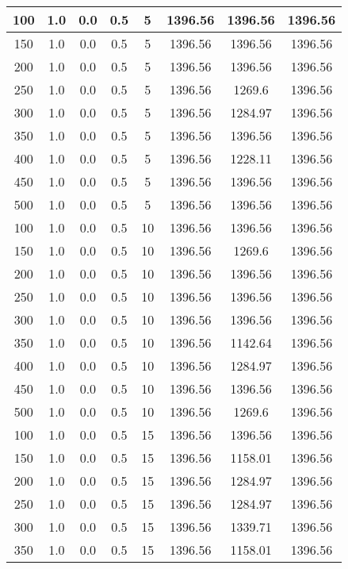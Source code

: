 \documentclass[a4paper, 12pt]{extreport}
\begin{document}
\begin{itemize}
\begin{longtable}{|c|c|c|c|c|c|c|c|}
			100 & 1.0 & 0.0 & 0.5 & 5 & 1396.56 & 1396.56 & 1396.56 \\\hline
			150 & 1.0 & 0.0 & 0.5 & 5 & 1396.56 & 1396.56 & 1396.56 \\\hline
			200 & 1.0 & 0.0 & 0.5 & 5 & 1396.56 & 1396.56 & 1396.56 \\\hline
			250 & 1.0 & 0.0 & 0.5 & 5 & 1396.56 & 1269.6 & 1396.56 \\\hline
			300 & 1.0 & 0.0 & 0.5 & 5 & 1396.56 & 1284.97 & 1396.56 \\\hline
			350 & 1.0 & 0.0 & 0.5 & 5 & 1396.56 & 1396.56 & 1396.56 \\\hline
			400 & 1.0 & 0.0 & 0.5 & 5 & 1396.56 & 1228.11 & 1396.56 \\\hline
			450 & 1.0 & 0.0 & 0.5 & 5 & 1396.56 & 1396.56 & 1396.56 \\\hline
			500 & 1.0 & 0.0 & 0.5 & 5 & 1396.56 & 1396.56 & 1396.56 \\\hline
			100 & 1.0 & 0.0 & 0.5 & 10 & 1396.56 & 1396.56 & 1396.56 \\\hline
			150 & 1.0 & 0.0 & 0.5 & 10 & 1396.56 & 1269.6 & 1396.56 \\\hline
			200 & 1.0 & 0.0 & 0.5 & 10 & 1396.56 & 1396.56 & 1396.56 \\\hline
			250 & 1.0 & 0.0 & 0.5 & 10 & 1396.56 & 1396.56 & 1396.56 \\\hline
			300 & 1.0 & 0.0 & 0.5 & 10 & 1396.56 & 1396.56 & 1396.56 \\\hline
			350 & 1.0 & 0.0 & 0.5 & 10 & 1396.56 & 1142.64 & 1396.56 \\\hline
			400 & 1.0 & 0.0 & 0.5 & 10 & 1396.56 & 1284.97 & 1396.56 \\\hline
			450 & 1.0 & 0.0 & 0.5 & 10 & 1396.56 & 1396.56 & 1396.56 \\\hline
			500 & 1.0 & 0.0 & 0.5 & 10 & 1396.56 & 1269.6 & 1396.56 \\\hline
			100 & 1.0 & 0.0 & 0.5 & 15 & 1396.56 & 1396.56 & 1396.56 \\\hline
			150 & 1.0 & 0.0 & 0.5 & 15 & 1396.56 & 1158.01 & 1396.56 \\\hline
			200 & 1.0 & 0.0 & 0.5 & 15 & 1396.56 & 1284.97 & 1396.56 \\\hline
			250 & 1.0 & 0.0 & 0.5 & 15 & 1396.56 & 1284.97 & 1396.56 \\\hline
			300 & 1.0 & 0.0 & 0.5 & 15 & 1396.56 & 1339.71 & 1396.56 \\\hline
			350 & 1.0 & 0.0 & 0.5 & 15 & 1396.56 & 1158.01 & 1396.56 \\\hline

\end{longtable}
\end{itemize}
\end{document}
